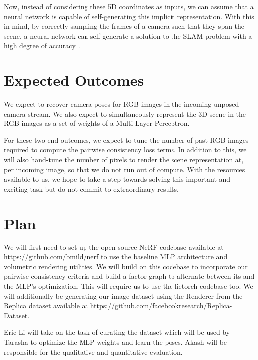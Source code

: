 \documentclass[15pt,letterpaper]{article}
\begin{document}
Now, instead of considering these 5D coordinates as inputs, we can assume that a neural network is capable of self-generating this implicit representation. With this in mind, by correctly sampling the frames of a camera such that they span the scene, a neural network can self generate a solution to the SLAM problem with a high degree of accuracy \cite{imap}.

\section{Expected Outcomes}%
\label{sec:Expected Outcomes}
We expect to recover camera poses for RGB images in the incoming unposed camera stream. We also expect to simultaneously represent the 3D scene in the RGB images as a set of weights of a Multi-Layer Perceptron.

For these two end outcomes, we expect to tune the number of past RGB images required to compute the pairwise consistency loss terms. In addition to this, we will also hand-tune the number of pixels to render the scene representation at, per incoming image, so that we do not run out of compute. With the resources available to us, we hope to take a step towards solving this important and exciting task but do not commit to extraordinary results.
\section{Plan}%
\label{sec:Plan}

We will first need to set up the open-source NeRF codebase available at \hyperlink{https://github.com/bmild/nerf}{https://github.com/bmild/nerf} to use the baseline MLP architecture and volumetric rendering utilities. We will build on this codebase to incorporate our pairwise consistency criteria and build a factor graph to alternate between its and the MLP's optimization. This will require us to use the lietorch codebase too. We will additionally be generating our image dataset using the Renderer from the Replica dataset available at \hyperlink{https://github.com/facebookresearch/Replica-Dataset}{https://github.com/facebookresearch/Replica-Dataset}. 

Eric Li will take on the task of curating the dataset which will be used by Tarasha to optimize the MLP weights and learn the poses. Akash will be responsible for the qualitative and quantitative evaluation.



\end{document}
